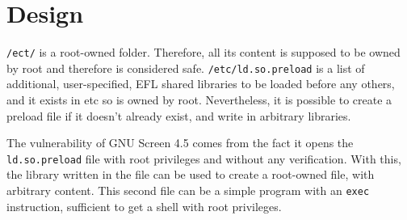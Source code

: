 \section{Design}
{\tt /ect/} is a root-owned folder. Therefore, all its content is supposed to be owned by root and therefore is considered safe. {\tt /etc/ld.so.preload} is a list of additional, user-specified, EFL shared libraries to be loaded before any others, and it exists in etc so is owned by root. Nevertheless, it is possible to create a preload file if it doesn't already exist, and write in arbitrary libraries.


The vulnerability of GNU Screen 4.5 comes from the fact it opens the {\tt ld.so.preload} file with root privileges and without any verification. With this, the library written in the file can be used to create a root-owned file, with arbitrary content. This second file can be a simple program with an {\tt exec} instruction, sufficient to get a shell with root privileges.
